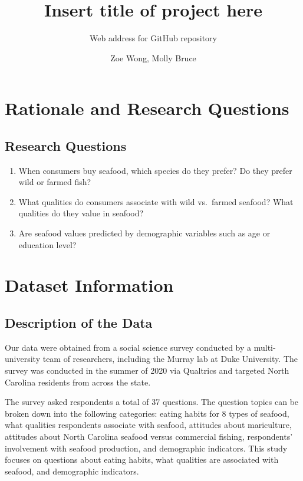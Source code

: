 \documentclass[
  12pt,
]{article}
\title{Insert title of project here}
\subtitle{Web address for GitHub repository}
\author{Zoe Wong, Molly Bruce}
\date{}
\providecommand{\tightlist}{%
  \setlength{\itemsep}{0pt}\setlength{\parskip}{0pt}}
\begin{document}
\maketitle

\newpage
\tableofcontents 
\newpage
\listoftables 
\newpage
\listoffigures 
\newpage

\hypertarget{rationale-and-research-questions}{%
\section{Rationale and Research
Questions}\label{rationale-and-research-questions}}

\hypertarget{research-questions}{%
\subsection{Research Questions}\label{research-questions}}

\begin{enumerate}
\def\labelenumi{\arabic{enumi}.}
\tightlist
\item
  When consumers buy seafood, which species do they prefer? Do they
  prefer wild or farmed fish?
\item
  What qualities do consumers associate with wild vs.~farmed seafood?
  What qualities do they value in seafood?
\item
  Are seafood values predicted by demographic variables such as age or
  education level?
\end{enumerate}

\newpage

\hypertarget{dataset-information}{%
\section{Dataset Information}\label{dataset-information}}

\hypertarget{description-of-the-data}{%
\subsection{Description of the Data}\label{description-of-the-data}}

Our data were obtained from a social science survey conducted by a
multi-university team of researchers, including the Murray lab at Duke
University. The survey was conducted in the summer of 2020 via Qualtrics
and targeted North Carolina residents from across the state.

The survey asked respondents a total of 37 questions. The question
topics can be broken down into the following categories: eating habits
for 8 types of seafood, what qualities respondents associate with
seafood, attitudes about mariculture, attitudes about North Carolina
seafood versus commercial fishing, respondents' involvement with seafood
production, and demographic indicators. This study focuses on questions
about eating habits, what qualities are associated with seafood, and
demographic indicators.
\end{document}
